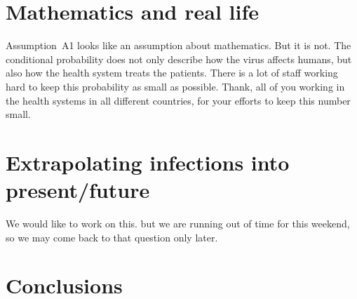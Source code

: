 \documentclass[a4paper]{article}
\begin{document}
\section{Mathematics and real life}
Assumption~A1 looks like an assumption about mathematics. 
But it is not. 
The conditional probability does not 
only describe how
the virus affects humans, 
but also how the health system treats the patients. 
There is a lot of staff working hard to 
keep this probability as small as possible. 
Thank, all of you working in the health systems in all different countries, for 
your efforts to keep this number small. 




\section{Extrapolating infections into present/future}
We would like to work on this. but we are running out of time for this weekend, so we may come back to that question only later.

\section{Conclusions}

\begin{center}
\end{center}


\end{document}

